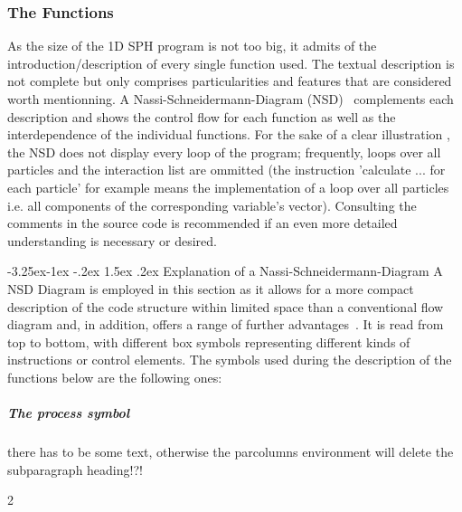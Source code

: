 \documentclass{report}
\makeatletter
\renewcommand\paragraph{\@startsection{paragraph}{4}{\z@}%
  {-3.25ex\@plus -1ex \@minus -.2ex}%
  {1.5ex \@plus .2ex}%
  {\normalfont\normalsize\bfseries}}
\makeatother
\begin{document}
\subsubsection{The Functions}

As the size of the 1D SPH program is not too big, it admits of the introduction/description of every single function used. The textual description is not complete but only comprises particularities and features that are considered worth mentionning. A Nassi-Schneidermann-Diagram (NSD)~\cite{Nassi1973} complements each description and shows the control flow for each function as well as the interdependence of the individual functions. For the sake of a clear illustration , the NSD does not display every loop of the program; frequently, loops over all particles and the interaction list are ommitted (the instruction 'calculate ... for each particle' for example means the implementation of a loop over all particles i.e. all components of the corresponding variable's vector).  Consulting the comments in the source code is recommended if an even more detailed understanding is necessary or desired.

\paragraph{Explanation of a Nassi-Schneidermann-Diagram}
A NSD Diagram is employed in this section as it allows for a more compact description of the code structure within limited space than a conventional flow diagram and, in addition, offers a range of further advantages~\cite{Nassi1973}. It is read from top to bottom, with different box symbols representing different kinds of instructions or control elements. The symbols used during the description of the functions below are the following ones:

\subparagraph{The process symbol}
there has to be some text, otherwise the parcolumns environment will delete the subparagraph heading!?!
\vspace{5mm}
\begin{parcolumns} [colwidths={1=60mm,2=35mm}] {2}  
 

\colplacechunks
\end{parcolumns}
\end{document}
